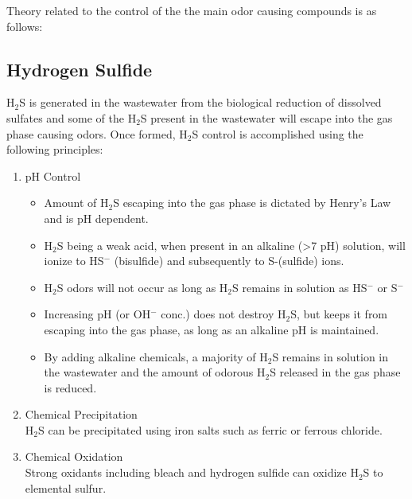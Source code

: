 Theory related to the control of the the main odor causing compounds is as follows:

\subsection{Hydrogen Sulfide}
H$_2$S is generated in the wastewater from the biological reduction of dissolved sulfates and some of the H$_2$S present in the wastewater will escape into the gas phase causing odors.  Once formed, H$_2$S control is accomplished using the following principles:
\begin{enumerate}
\item pH Control
\begin{itemize}
\item Amount of H$_2$S escaping into the gas phase is dictated by Henry’s Law and is pH dependent.
\item H$_2$S being a weak acid, when present in an alkaline (>7 pH) solution, will ionize to HS$^-$ (bisulfide) and subsequently to S-(sulfide) ions.
\item H$_2$S odors will not occur as long as H$_2$S remains in solution as HS$^-$ or S$^-$
\item Increasing pH (or OH$^-$ conc.) does not destroy H$_2$S, but keeps it from escaping into the gas phase, as long as an alkaline pH is maintained.
\item By adding alkaline chemicals, a majority of H$_2$S remains in solution in the wastewater and the amount of odorous H$_2$S released in the gas phase is reduced.
\end{itemize}
\item{Chemical Precipitation}\\
H$_2$S can be precipitated using iron salts such as ferric or ferrous chloride.
\item{Chemical Oxidation}\\
Strong oxidants including bleach and hydrogen sulfide can oxidize H$_2$S to elemental sulfur.
%	
\end{enumerate}

